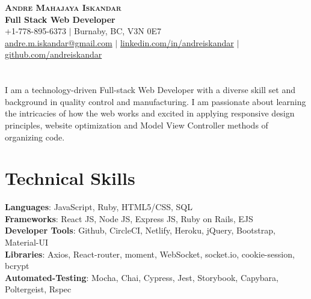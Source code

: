 \documentclass[letterpaper,10.5pt]{article}
\begin{document}

\begin{center}
    \textbf{\Huge \scshape Andre Mahajaya Iskandar} \\ \vspace{5pt}
    \textbf{\large Full Stack Web Developer}\vspace{5pt} \\
    \small \faPhoneSquare{ }+1-778-895-6373 $|$ \faHome{ }Burnaby, BC, V3N 0E7 \\
    \href{mailto:andre.m.iskandar@gmail.com}{\faEnvelope{ }andre.m.iskandar@gmail.com} $|$ 
    \href{https://linkedin.com/in/andreiskandar}{\faLinkedin{ }linkedin.com/in/andreiskandar} $|$
    \href{https://github.com/andreiskandar}{\faGithub{ }github.com/andreiskandar} \vspace{-10pt}
\end{center}

\section{}
I am a technology-driven Full-stack Web Developer with a diverse skill set and background in quality control and manufacturing. I am passionate about learning the intricacies of how the web works and excited in applying responsive design principles, website optimization and Model View Controller methods of organizing code. 

\section{Technical Skills}

  \begin{itemize}[leftmargin=0.15in, label={}]
    \small{\item{
      \textbf{Languages}{: JavaScript, Ruby, HTML5/CSS, SQL} \\
      \textbf{Frameworks}{: React JS, Node JS, Express JS, Ruby on Rails, EJS} \\
      \textbf{Developer Tools}{: Github, CircleCI, Netlify, Heroku, jQuery, Bootstrap, Material-UI} \\
      \textbf{Libraries}{: Axios, React-router, moment, WebSocket, socket.io, cookie-session, bcrypt } \\
      \textbf{Automated-Testing}{: Mocha, Chai, Cypress, Jest, Storybook, Capybara, Poltergeist, Rspec }
    }}
  \end{itemize}
\end{document}
